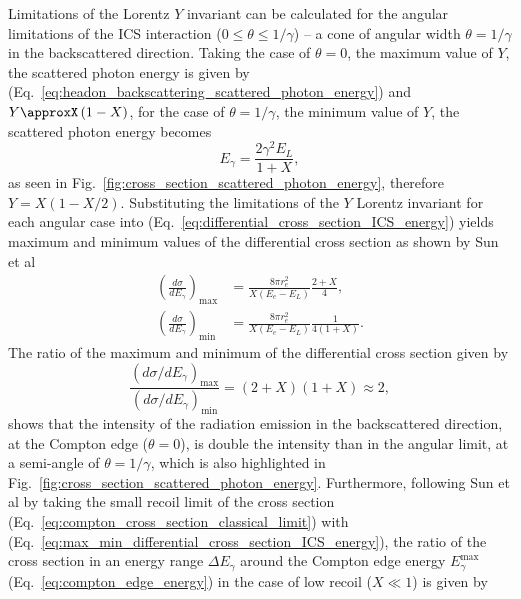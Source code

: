 \documentclass[../main.tex]{subfiles}
\begin{document}
Limitations of the Lorentz $Y$ invariant can be calculated for the angular limitations of the ICS interaction ($0 \leq \theta \leq 1/\gamma$) -- a cone of angular width $\theta=1/\gamma$ in the backscattered direction. Taking the case of $\theta = 0$, the maximum value of $Y$, the scattered photon energy is given by (Eq.~\ref{eq:headon_backscattering_scattered_photon_energy}) and $Y\approxX\left(1-X\right)$, for the case of $\theta = 1/\gamma$, the minimum value of $Y$, the scattered photon energy becomes
\begin{equation}
E_{\gamma} = \frac{2\gamma^{2}E_{L}}{1+X},
\label{eq:angular_limit_scattered_photon_energy}
\end{equation}
as seen in Fig.~\ref{fig:cross_section_scattered_photon_energy}, therefore $Y = X\left(1-X/2\right)$. Substituting the limitations of the $Y$ Lorentz invariant for each angular case into (Eq.~\ref{eq:differential_cross_section_ICS_energy}) yields maximum and minimum values of the differential cross section as shown by Sun et al \cite{sun2011theoretical}
\begin{align}
\left(\frac{d\sigma}{dE_{\gamma}}\right)_{\mathrm{max}} &= \frac{8\pi r_{e}^{2}}{X\left(E_{e}-E_{L}\right)}\frac{2+X}{4}, \nonumber \\
\left(\frac{d\sigma}{dE_{\gamma}}\right)_{\mathrm{min}} &= \frac{8\pi r_{e}^{2}}{X\left(E_{e}-E_{L}\right)}\frac{1}{4\left(1+X\right)}.
\label{eq:max_min_differential_cross_section_ICS_energy}    
\end{align}
The ratio of the maximum and minimum of the differential cross section given by 
\begin{equation}
\frac{\left(d\sigma/dE_{\gamma}\right)_{\mathrm{max}}}{\left(d\sigma/dE_{\gamma}\right)_{\mathrm{min}}} = \left(2+X\right)\left(1+X\right) \approx 2,
\label{eq:max_min_cross_section_ratio}
\end{equation}
shows that the intensity of the radiation emission in the backscattered direction, at the Compton edge ($\theta=0$), is double the intensity than in the angular limit, at a semi-angle of $\theta=1/\gamma$, which is also highlighted in Fig.~\ref{fig:cross_section_scattered_photon_energy}. Furthermore, following Sun et al \cite{sun2011theoretical} by taking the small recoil limit of the cross section (Eq.~\ref{eq:compton_cross_section_classical_limit}) with (Eq.~\ref{eq:max_min_differential_cross_section_ICS_energy}), the ratio of the cross section in an energy range $\Delta E_{\gamma}$ around the Compton edge energy $E_{\gamma}^{\mathrm{max}}$ (Eq.~\ref{eq:compton_edge_energy}) in the case of low recoil ($X \ll 1$) is given by
\end{document}

